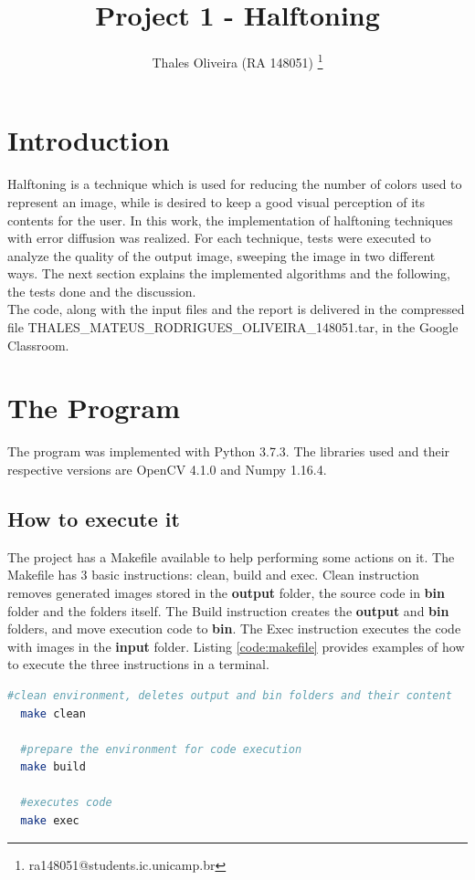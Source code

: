 \documentclass[]{IEEEtran}
\begin{document}
  \title{Project 1 - Halftoning}
  \author{Thales Oliveira (RA 148051)
    \thanks{ra148051@students.ic.unicamp.br}
  }
  \maketitle
  
  \begin{abstract}

  \end{abstract}
  
\section{Introduction}
Halftoning is a technique which is used for reducing the number of colors used to represent an image, while is desired to keep a good visual perception of its contents for the user. In this work, the implementation of halftoning techniques with error diffusion was realized. For each technique, tests were executed to analyze the quality of the output image, sweeping the image in two different ways. The next section explains the implemented algorithms and the following, the tests done and the discussion.
\\
The code, along with the input files and the report is delivered in the compressed file THALES\_MATEUS\_RODRIGUES\_OLIVEIRA\_148051.tar, in the Google Classroom.
\section{The Program}
 
The program was implemented with Python 3.7.3. The libraries used and their respective versions are OpenCV 4.1.0 and Numpy 1.16.4.

\subsection{How to execute it}

The project has a Makefile available to help performing some actions on it. The Makefile has 3 basic instructions: clean, build and exec. Clean instruction removes generated images stored in the \textbf{output} folder, the source code in \textbf{bin} folder and the folders itself. The Build instruction creates the \textbf{output} and \textbf{bin} folders, and move execution code to \textbf{bin}. The Exec instruction executes the code with images in the \textbf{input} folder. Listing \ref{code:makefile} provides examples of how to execute the three instructions in a terminal.
\begin{lstlisting}[language=sh, caption={Makefile usage example}, label={code:makefile}]
  #clean environment, deletes output and bin folders and their content
  make clean
  
  #prepare the environment for code execution
  make build 

  #executes code
  make exec
\end{lstlisting}
\end{document}
